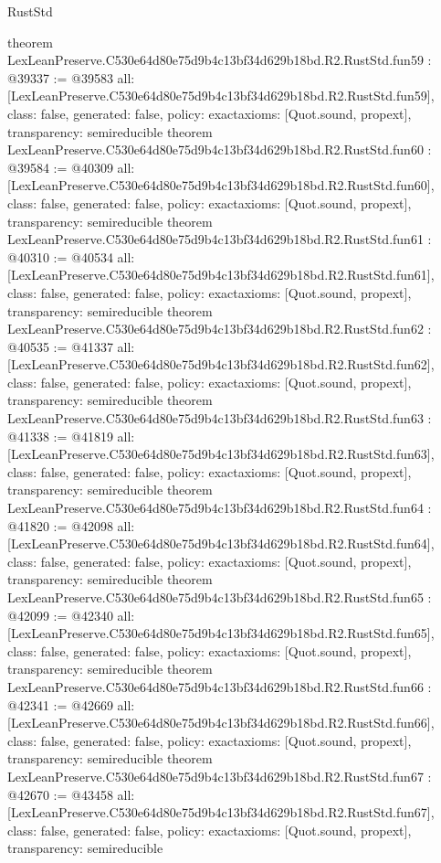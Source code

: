 \begin{lexlean}{RustStd}
\begin{coremodule}
{}
theorem LexLeanPreserve.C530e64d80e75d9b4c13bf34d629b18bd.R2.RustStd.fun59 : @39337 := @39583 {
  all: [LexLeanPreserve.C530e64d80e75d9b4c13bf34d629b18bd.R2.RustStd.fun59],
  class: false,
  generated: false,
  policy: exact{axioms: [Quot.sound, propext]},
  transparency: semireducible
}
theorem LexLeanPreserve.C530e64d80e75d9b4c13bf34d629b18bd.R2.RustStd.fun60 : @39584 := @40309 {
  all: [LexLeanPreserve.C530e64d80e75d9b4c13bf34d629b18bd.R2.RustStd.fun60],
  class: false,
  generated: false,
  policy: exact{axioms: [Quot.sound, propext]},
  transparency: semireducible
}
theorem LexLeanPreserve.C530e64d80e75d9b4c13bf34d629b18bd.R2.RustStd.fun61 : @40310 := @40534 {
  all: [LexLeanPreserve.C530e64d80e75d9b4c13bf34d629b18bd.R2.RustStd.fun61],
  class: false,
  generated: false,
  policy: exact{axioms: [Quot.sound, propext]},
  transparency: semireducible
}
theorem LexLeanPreserve.C530e64d80e75d9b4c13bf34d629b18bd.R2.RustStd.fun62 : @40535 := @41337 {
  all: [LexLeanPreserve.C530e64d80e75d9b4c13bf34d629b18bd.R2.RustStd.fun62],
  class: false,
  generated: false,
  policy: exact{axioms: [Quot.sound, propext]},
  transparency: semireducible
}
theorem LexLeanPreserve.C530e64d80e75d9b4c13bf34d629b18bd.R2.RustStd.fun63 : @41338 := @41819 {
  all: [LexLeanPreserve.C530e64d80e75d9b4c13bf34d629b18bd.R2.RustStd.fun63],
  class: false,
  generated: false,
  policy: exact{axioms: [Quot.sound, propext]},
  transparency: semireducible
}
theorem LexLeanPreserve.C530e64d80e75d9b4c13bf34d629b18bd.R2.RustStd.fun64 : @41820 := @42098 {
  all: [LexLeanPreserve.C530e64d80e75d9b4c13bf34d629b18bd.R2.RustStd.fun64],
  class: false,
  generated: false,
  policy: exact{axioms: [Quot.sound, propext]},
  transparency: semireducible
}
theorem LexLeanPreserve.C530e64d80e75d9b4c13bf34d629b18bd.R2.RustStd.fun65 : @42099 := @42340 {
  all: [LexLeanPreserve.C530e64d80e75d9b4c13bf34d629b18bd.R2.RustStd.fun65],
  class: false,
  generated: false,
  policy: exact{axioms: [Quot.sound, propext]},
  transparency: semireducible
}
theorem LexLeanPreserve.C530e64d80e75d9b4c13bf34d629b18bd.R2.RustStd.fun66 : @42341 := @42669 {
  all: [LexLeanPreserve.C530e64d80e75d9b4c13bf34d629b18bd.R2.RustStd.fun66],
  class: false,
  generated: false,
  policy: exact{axioms: [Quot.sound, propext]},
  transparency: semireducible
}
theorem LexLeanPreserve.C530e64d80e75d9b4c13bf34d629b18bd.R2.RustStd.fun67 : @42670 := @43458 {
  all: [LexLeanPreserve.C530e64d80e75d9b4c13bf34d629b18bd.R2.RustStd.fun67],
  class: false,
  generated: false,
  policy: exact{axioms: [Quot.sound, propext]},
  transparency: semireducible
}
\end{coremodule}
\end{lexlean}
